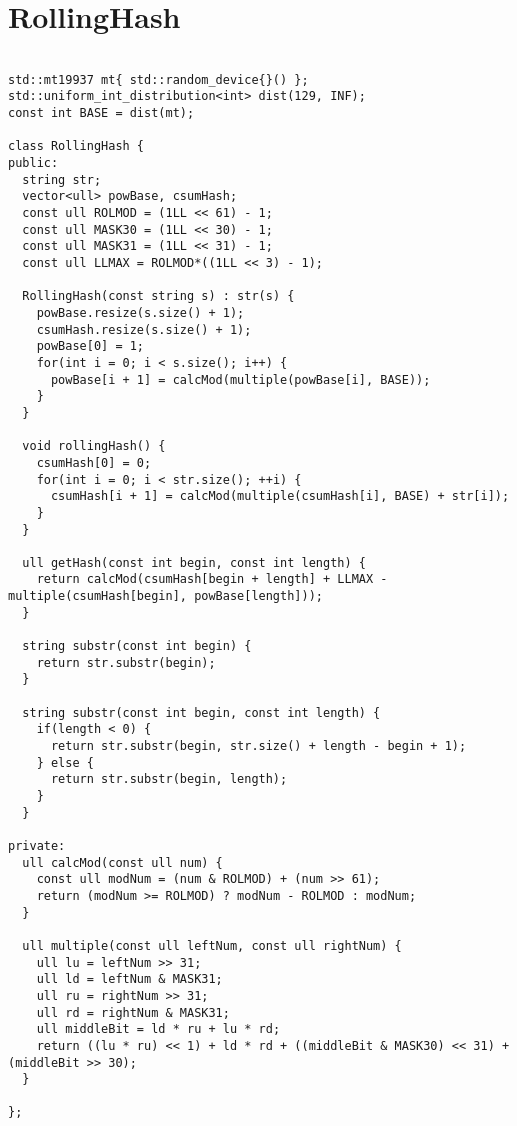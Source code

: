 \documentclass[a4j,titlepage]{jarticle} %
\begin{document}
\color{white}
\section{RollingHash}
\color{black}
\begin{lstlisting}[caption=RollingHash]

std::mt19937 mt{ std::random_device{}() };
std::uniform_int_distribution<int> dist(129, INF);
const int BASE = dist(mt);

class RollingHash {
public:
  string str;
  vector<ull> powBase, csumHash;
  const ull ROLMOD = (1LL << 61) - 1;
  const ull MASK30 = (1LL << 30) - 1;
  const ull MASK31 = (1LL << 31) - 1;
  const ull LLMAX = ROLMOD*((1LL << 3) - 1);

  RollingHash(const string s) : str(s) {
    powBase.resize(s.size() + 1);
    csumHash.resize(s.size() + 1);
    powBase[0] = 1;
    for(int i = 0; i < s.size(); i++) {
      powBase[i + 1] = calcMod(multiple(powBase[i], BASE));
    }
  }

  void rollingHash() {
    csumHash[0] = 0;
    for(int i = 0; i < str.size(); ++i) {
      csumHash[i + 1] = calcMod(multiple(csumHash[i], BASE) + str[i]);
    }
  }

  ull getHash(const int begin, const int length) {
    return calcMod(csumHash[begin + length] + LLMAX - multiple(csumHash[begin], powBase[length]));
  }

  string substr(const int begin) {
    return str.substr(begin);
  }

  string substr(const int begin, const int length) {
    if(length < 0) {
      return str.substr(begin, str.size() + length - begin + 1);
    } else {
      return str.substr(begin, length);
    }
  }

private:
  ull calcMod(const ull num) {
    const ull modNum = (num & ROLMOD) + (num >> 61);
    return (modNum >= ROLMOD) ? modNum - ROLMOD : modNum;
  }

  ull multiple(const ull leftNum, const ull rightNum) {
    ull lu = leftNum >> 31;
    ull ld = leftNum & MASK31;
    ull ru = rightNum >> 31;
    ull rd = rightNum & MASK31;
    ull middleBit = ld * ru + lu * rd;
    return ((lu * ru) << 1) + ld * rd + ((middleBit & MASK30) << 31) + (middleBit >> 30);
  }

};

\end{lstlisting}

\color{white}
\end{document}
